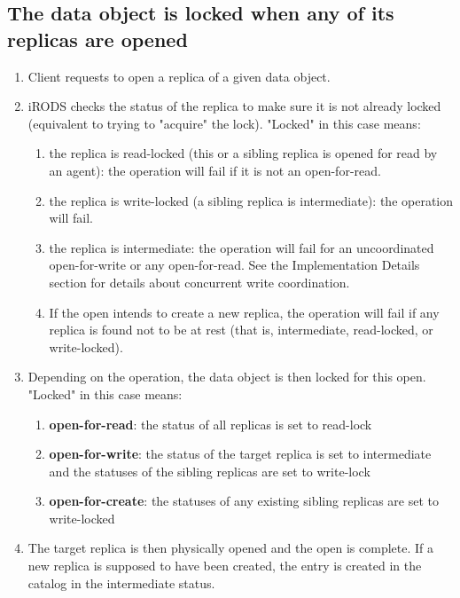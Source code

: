 \documentclass{irodsugm}
\begin{document}
\subsection*{The data object is locked when any of its replicas are opened}

\begin{enumerate}
\item Client requests to open a replica of a given data object.
\item iRODS checks the status of the replica to make sure it is not already locked (equivalent to trying to "acquire" the lock). "Locked" in this case means:
   \begin{enumerate}
   \item the replica is read-locked (this or a sibling replica is opened for read by an agent): the operation will fail if it is not an open-for-read.
   \item the replica is write-locked (a sibling replica is intermediate): the operation will fail.
   \item the replica is intermediate: the operation will fail for an uncoordinated open-for-write or any open-for-read. See the Implementation Details section for details about concurrent write coordination.
   \item If the open intends to create a new replica, the operation will fail if any replica is found not to be at rest (that is, intermediate, read-locked, or write-locked).
   \end{enumerate}
\item Depending on the operation, the data object is then locked for this open. "Locked" in this case means:
   \begin{enumerate}
   \item \textbf{open-for-read}: the status of all replicas is set to read-lock
   \item \textbf{open-for-write}: the status of the target replica is set to intermediate and the statuses of the sibling replicas are set to write-lock
   \item \textbf{open-for-create}: the statuses of any existing sibling replicas are set to write-locked
   \end{enumerate}
\item The target replica is then physically opened and the open is complete. If a new replica is supposed to have been created, the entry is created in the catalog in the intermediate status.
\end{enumerate}
\end{document}
